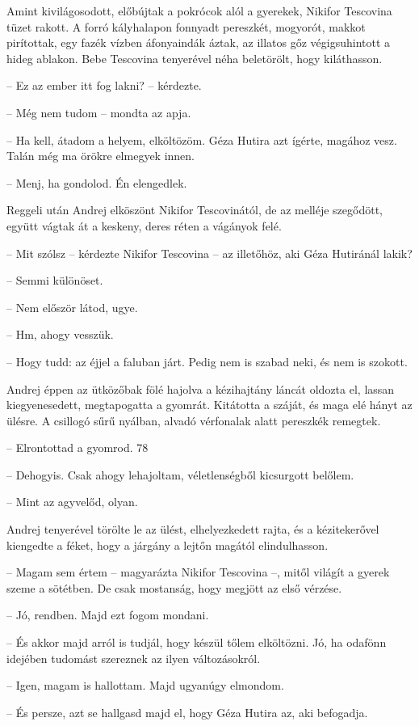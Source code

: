 \documentclass{IEEEtran}
\begin{document}
Amint kivilágosodott, előbújtak a pokrócok alól a gyerekek, Nikifor Tescovina
tüzet rakott. A forró kályhalapon fonnyadt pereszkét, mogyorót, makkot
pirítottak, egy fazék vízben áfonyaindák áztak, az illatos gőz végigsuhintott
a hideg ablakon. Bebe Tescovina tenyerével néha beletörölt, hogy kiláthasson.

– Ez az ember itt fog lakni? – kérdezte.

– Még nem tudom – mondta az apja.

– Ha kell, átadom a helyem, elköltözöm. Géza Hutira azt ígérte, magához vesz.
Talán még ma örökre elmegyek innen.

– Menj, ha gondolod. Én elengedlek.

Reggeli után Andrej elköszönt Nikifor Tescovinától, de az melléje szegődött,
együtt vágtak át a keskeny, deres réten a vágányok felé.

– Mit szólsz – kérdezte Nikifor Tescovina – az illetőhöz, aki Géza Hutiránál
lakik?

– Semmi különöset.

– Nem először látod, ugye.

– Hm, ahogy vesszük.

– Hogy tudd: az éjjel a faluban járt. Pedig nem is szabad neki, és nem is
szokott.

Andrej éppen az ütközőbak fölé hajolva a kézihajtány láncát oldozta el, lassan
kiegyenesedett, megtapogatta a gyomrát. Kitátotta a száját, és maga elé hányt
az ülésre. A csillogó sűrű nyálban, alvadó vérfonalak alatt pereszkék
remegtek.

– Elrontottad a gyomrod.
78

– Dehogyis. Csak ahogy lehajoltam, véletlenségből kicsurgott belőlem.

– Mint az agyvelőd, olyan.

Andrej tenyerével törölte le az ülést, elhelyezkedett rajta, és a
kézitekerővel kiengedte a féket, hogy a járgány a lejtőn magától
elindulhasson.

– Magam sem értem – magyarázta Nikifor Tescovina –, mitől világít a gyerek
szeme a sötétben. De csak mostanság, hogy megjött az első vérzése.

– Jó, rendben. Majd ezt fogom mondani.

– És akkor majd arról is tudjál, hogy készül tőlem elköltözni. Jó, ha odafönn
idejében tudomást szereznek az ilyen változásokról.

– Igen, magam is hallottam. Majd ugyanúgy elmondom.

– És persze, azt se hallgasd majd el, hogy Géza Hutira az, aki befogadja.
\end{document}
